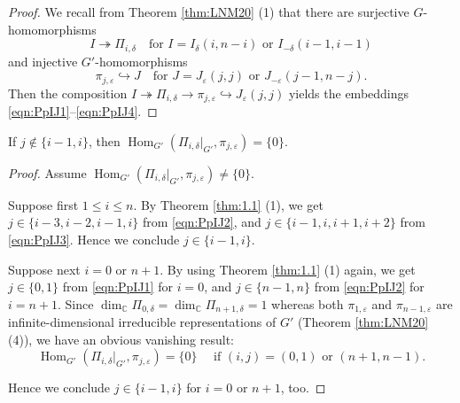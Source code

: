 \begin{proof}
We recall from Theorem \ref{thm:LNM20} (1)
 that there are surjective $G$-homomorphisms
\[
  I \twoheadrightarrow \Pi_{i,\delta}
\quad
  \text{for }
  I= I_{\delta}(i,n-i) 
  \text{ or }
  I_{-\delta}(i-1,i-1)
\]
 and injective $G'$-homomorphisms
\[
  \pi_{j,\varepsilon} \hookrightarrow J
 \quad \text{for $J=J_{\varepsilon}(j,j)$ or $J_{-\varepsilon}(j-1,n-j)$}.  
\]
Then the composition 
 $I \twoheadrightarrow \Pi_{i,\delta} \to \pi_{j,\varepsilon} \hookrightarrow J_{\varepsilon}(j,j)$
 yields the embeddings \eqref{eqn:PpIJ1}--\eqref{eqn:PpIJ4}.  
\end{proof}

\begin{proposition}
\label{prop:Ppvanish}
If $j \notin \{i-1,i\}$, 
 then 
$
{\operatorname{Hom}}_{G'}(\Pi_{i,\delta}|_{G'}, \pi_{j,\varepsilon})
=
\{0\}.  
$
\end{proposition}
\begin{proof}
Assume ${\operatorname{Hom}}_{G'}(\Pi_{i,\delta}|_{G'}, \pi_{j,\varepsilon})
\ne
\{0\}$.  



Suppose first $1 \le i \le n$.  
By Theorem \ref{thm:1.1} (1), 
 we get $j \in \{i-3, i-2, i-1,i\}$ from \eqref{eqn:PpIJ2}, 
 and $j \in \{i-1, i, i+1,i+2\}$ from \eqref{eqn:PpIJ3}.  
Hence we conclude $j \in \{i-1,i\}$.  


Suppose next $i=0$ or $n+1$.  
By using Theorem \ref{thm:1.1} (1) again, 
 we get $j \in \{0,1\}$ from \eqref{eqn:PpIJ1} for $i=0$, 
 and $j \in \{n-1,n\}$ from \eqref{eqn:PpIJ2} for $i=n+1$.  
Since $\dim_{\mathbb{C}} \Pi_{0,\delta}= \dim_{\mathbb{C}} \Pi_{n+1,\delta}=1$
 whereas both $\pi_{1,\varepsilon}$ and $\pi_{n-1,\varepsilon}$
 are infinite-dimensional irreducible representations of $G'$
 (Theorem \ref{thm:LNM20} (4)), 
 we have an obvious vanishing result:
\[
{\operatorname{Hom}}_{G'}(\Pi_{i,\delta}|_{G'}, \pi_{j,\varepsilon})
=\{0\}
\quad
\text{ if $(i,j)=(0,1)$ or $(n+1,n-1)$}.  
\]


Hence we conclude $j \in \{i-1,i\}$
 for $i=0$ or $n+1$, too.  
\end{proof}



